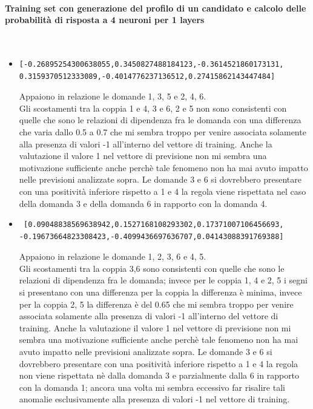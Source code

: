 \paragraph{Training set con generazione del profilo di un candidato e calcolo delle probabilit\`a di risposta a 4 neuroni per 1 layers}\mbox{}
\label{Training set con generazione del profilo di un candidato e calcolo delle probabilita di risposta a 4 neuroni per 1 layers}
\\
\noindent
\begin{itemize}
\item \begin{verbatim}[-0.26895254300638055,0.3450827488184123,-0.3614521860173131,
0.3159370512333089,-0.4014776237136512,0.27415862143447484]
\end{verbatim}
Appaiono in relazione le domande 1, 3, 5  e 2, 4, 6.\\
Gli scostamenti tra la coppia 1 e 4, 3 e 6, 2 e 5 non sono consistenti con quelle che sono le relazioni di dipendenza fra le domanda con una differenza che varia dallo 0.5 a 0.7 che mi sembra troppo per venire associata solamente alla presenza di valori -1 all'interno del vettore di training. Anche la valutazione il valore 1 nel vettore di previsione non mi sembra una motivazione sufficiente anche perch\`e tale fenomeno non ha mai avuto impatto nelle previsioni analizzate sopra.
Le domande 3 e 6 si dovrebbero presentare con una positivit\`a inferiore rispetto a 1 e 4 la regola viene rispettata nel caso della domanda 3 e della domanda 6 in rapporto con la domanda 4.

\item \begin{verbatim} [0.09048838569638942,0.1527168108293302,0.17371007106456693,
-0.19673664823308423,-0.4099436697636707,0.04143088391769388]
\end{verbatim}
Appaiono in relazione le domande 1, 2, 3, 6 e 4, 5.\\
Gli scostamenti tra la coppia 3,6 sono consistenti con quelle che sono le relazioni di dipendenza fra le domanda;  invece per le coppia 1, 4 e 2, 5 i segni si presentano con una differenza  per la coppia la differenza \`e minima, invece per la coppia 2, 5 la differenza \`e del 0.65 che mi sembra troppo per venire associata solamente alla presenza di valori -1 all'interno del vettore di training. Anche la valutazione il valore 1 nel vettore di previsione non mi sembra una motivazione sufficiente anche perch\`e tale fenomeno non ha mai avuto impatto nelle previsioni analizzate sopra.
Le domande 3 e 6 si dovrebbero presentare con una positivit\`a inferiore rispetto a 1 e 4 la regola non viene rispettata n\`e dalla domanda 3 e parzialmente dalla 6 in rapporto con la domanda 1; ancora una volta mi sembra eccessivo far risalire tali anomalie esclusivamente alla presenza di valori -1 nel vettore di training.


\end{itemize}
